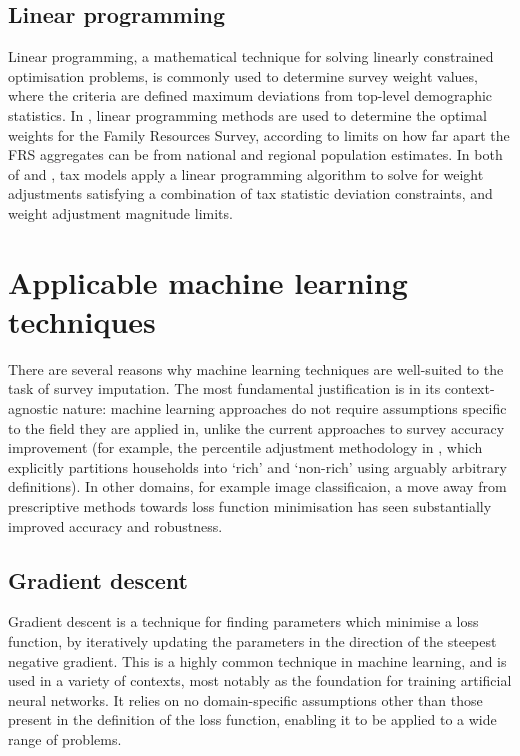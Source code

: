 \documentclass[twocolumn]{article}
\begin{document}
\subsection{Linear programming}

Linear programming, a mathematical technique for solving linearly constrained optimisation problems, is commonly used to determine survey weight values, where the criteria are defined maximum deviations from top-level demographic statistics. In \cite{frs_weighting_review}, linear programming methods are used to determine the optimal weights for the Family Resources Survey, according to limits on how far apart the FRS aggregates can be from national and regional population estimates. In both of \cite{tpc_microsim_docs} and \cite{taxdata_github}, tax models apply a linear programming algorithm to solve for weight adjustments satisfying a combination of tax statistic deviation constraints, and weight adjustment magnitude limits.

\section{Applicable machine learning techniques}

There are several reasons why machine learning techniques are well-suited to the task of survey imputation. The most fundamental justification is in its context-agnostic nature: machine learning approaches do not require assumptions specific to the field they are applied in, unlike the current approaches to survey accuracy improvement (for example, the percentile adjustment methodology in \cite{ons_spi_version_2}, which explicitly partitions households into `rich' and `non-rich' using arguably arbitrary definitions). In other domains, for example image classificaion, a move away from prescriptive methods towards loss function minimisation has seen substantially improved accuracy and robustness.\cite{image_classification_survey}

\subsection{Gradient descent}

Gradient descent is a technique for finding parameters which minimise a loss function, by iteratively updating the parameters in the direction of the steepest negative gradient.\cite{gradient_descent} This is a highly common technique in machine learning, and is used in a variety of contexts, most notably as the foundation for training artificial neural networks. It relies on no domain-specific assumptions other than those present in the definition of the loss function, enabling it to be applied to a wide range of problems.
\end{document}
